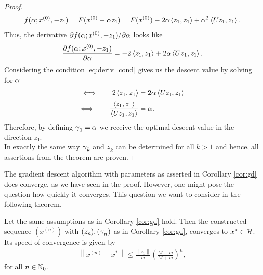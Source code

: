 \begin{proof}
\begin{align*}
f(\alpha; x^{(0)}, -z_1) = F(x^{(0)} - \alpha z_1) = F(x^{(0)}) - 2 \alpha\left\langle z_1, z_1 \right\rangle + \alpha^2\left\langle Uz_1, z_1 \right\rangle.
\end{align*}
Thus, the derivative $\partial f(\alpha; x^{(0)}, - z_1)/\partial \alpha$ looks like
\begin{align*}
\frac{\partial f(\alpha; x^{(0)}, - z_1)}{\partial \alpha} = - 2\left\langle z_1, z_1 \right\rangle + 2\alpha\left\langle Uz_1, z_1 \right\rangle.
\end{align*}
Considering the condition \eqref{eq:deriv_cond} gives us the descent value by solving for $\alpha$
\begin{align*}
\Longleftrightarrow \qquad  2\left\langle z_1, z_1 \right\rangle &= 2\alpha\left\langle Uz_1, z_1 \right\rangle\\
\Longleftrightarrow \qquad \frac{\left\langle z_1, z_1 \right\rangle}{\left\langle Uz_1, z_1 \right\rangle} &= \alpha.
\end{align*}
Therefore, by defining $\operatorname{\gamma}_1 = \alpha$ we receive the optimal descent value in the direction $z_1$.\\
In exactly the same way $\operatorname{\gamma}_k$ and $z_k$ can be determined for all $k>1$ and hence, all assertions from the theorem are proven.
\end{proof}

The gradient descent algorithm with parameters as asserted in Corollary \ref{cor:gd} does converge, as we have seen in the proof. However, one might pose the question how quickly it converges. This question we want to consider in the following theorem.

\begin{theorem}\label{theorem:gd}
Let the same assumptions as in Corollary \ref{cor:gd} hold. Then the constructed sequence $(x^{(n)})$ with $(z_n), (\operatorname{\gamma}_n)$ as in Corollary \ref{cor:gd}, converges to $x^{\ast}\in\mathcal{H}$. Its speed of convergence is given by
\begin{align*}
\left\|x^{(n)} - x^{\ast}\right\| \leq \frac{\|z_1\|}{m}\left( \frac{M - m}{M + m} \right)^n,
\end{align*}
for all $n\in\operatorname{\mathbb{N}}_0$.
\end{theorem}

